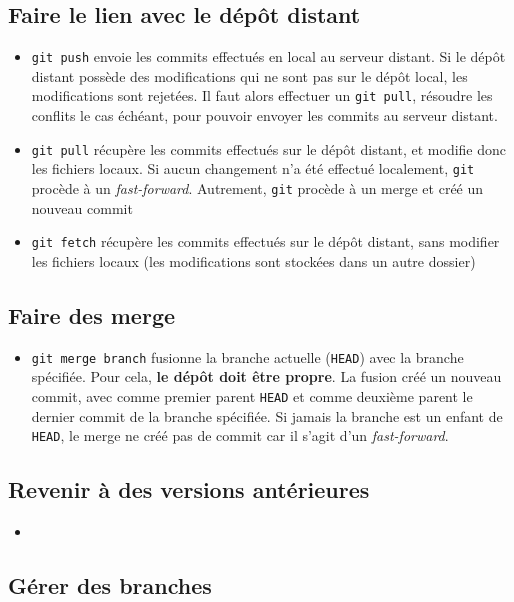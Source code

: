 \documentclass[french]{report}
\newcommand\itemb{\item[$\bullet$]}
\begin{document}
\subsection{Faire le lien avec le dépôt distant}

\begin{itemize}
    \itemb \texttt{git push} envoie les commits effectués en local au serveur distant.
    Si le dépôt distant possède des modifications qui ne sont pas sur le dépôt local, les modifications sont rejetées.
    Il faut alors effectuer un \texttt{git pull}, résoudre les conflits le cas échéant, pour pouvoir envoyer les commits au serveur distant.
    \itemb \texttt{git pull} récupère les commits effectués sur le dépôt distant, et modifie donc les fichiers locaux.
    Si aucun changement n'a été effectué localement, \texttt{git} procède à un \textit{fast-forward}.
    Autrement, \texttt{git} procède à un merge et créé un nouveau commit
    \itemb \texttt{git fetch} récupère les commits effectués sur le dépôt distant, sans modifier les fichiers locaux (les modifications sont stockées dans un autre dossier)
\end{itemize}

\subsection{Faire des merge}

\begin{itemize}
    \itemb \texttt{git merge branch} fusionne la branche actuelle (\texttt{HEAD}) avec la branche spécifiée.
    Pour cela, \textbf{le dépôt doit être propre}.
    La fusion créé un nouveau commit, avec comme premier parent \texttt{HEAD} et comme deuxième parent le dernier commit de la branche spécifiée.
    Si jamais la branche est un enfant de \texttt{HEAD}, le merge ne créé pas de commit car il s'agit d'un \textit{fast-forward}.
\end{itemize}


\subsection{Revenir à des versions antérieures}

\begin{itemize}
    \itemb 
\end{itemize}

\subsection{Gérer des branches}
\end{document}
